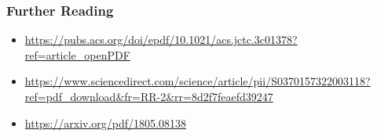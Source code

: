 \documentclass[
  letterpaper,
  DIV=11,
  numbers=noendperiod]{scrartcl}
\providecommand{\tightlist}{%
  \setlength{\itemsep}{0pt}\setlength{\parskip}{0pt}}\usepackage{longtable,booktabs,array}
\begin{document}
\subsubsection{Further Reading}\label{further-reading}

\begin{itemize}
\tightlist
\item
  \url{https://pubs.acs.org/doi/epdf/10.1021/acs.jctc.3c01378?ref=article_openPDF}
\item
  \url{https://www.sciencedirect.com/science/article/pii/S0370157322003118?ref=pdf_download&fr=RR-2&rr=8d2f7feaefd39247}
\item
  \url{https://arxiv.org/pdf/1805.08138}
\end{itemize}


\printbibliography
\end{document}
